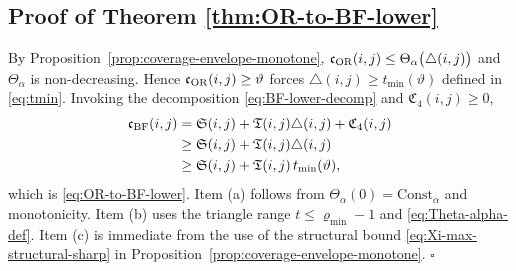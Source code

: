 \documentclass[twoside,11pt]{article}
\numberwithin{equation}{section}
\numberwithin{theorem}{section}
\numberwithin{example}{section}
\begin{document}
\subsection{Proof of Theorem \ref{thm:OR-to-BF-lower}}
By Proposition~\ref{prop:coverage-envelope-monotone}, $\mathfrak c_{\rm OR}(i,j)\le \Theta_\alpha\bigl(\triangle(i,j)\bigr)$
and $\Theta_\alpha$ is non-decreasing. Hence $\mathfrak c_{\rm OR}(i,j)\ge \vartheta$ forces $\triangle(i,j)\ge t_{\min}(\vartheta)$ defined in \eqref{eq:tmin}.
Invoking the decomposition \eqref{eq:BF-lower-decomp} and $\mathfrak C_4(i,j)\ge 0$,
\[
\begin{aligned}
\mathfrak c_{\rm BF}(i,j)&=\mathfrak S(i,j)+\mathfrak T(i,j)\triangle(i,j)+\mathfrak C_4(i,j) \\ 
&\ge \mathfrak S(i,j)+\mathfrak T(i,j)\triangle(i,j)
\\ 
&\ge \mathfrak S(i,j)+\mathfrak T(i,j)\,t_{\min}(\vartheta),
\end{aligned}
\]
which is \eqref{eq:OR-to-BF-lower}. Item (a) follows from $\Theta_\alpha(0)=\mathrm{Const}_\alpha$ and monotonicity.
Item (b) uses the triangle range $t\le\varrho_{\min}-1$ and \eqref{eq:Theta-alpha-def}.
Item (c) is immediate from the use of the structural bound \eqref{eq:Xi-max-structural-sharp} in Proposition~\ref{prop:coverage-envelope-monotone}.
\hfill $\square$
\end{document}
